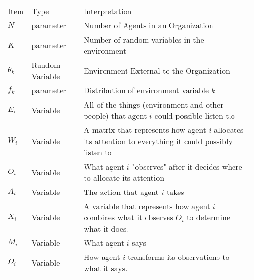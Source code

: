 \documentclass{article}
\begin{document}
\begin{table}[h!]
\centering
\begin{tabular}{|p{1in}|p{1.5in}|p{3in}|}
\hline
Item       & Type            & Interpretation                                                                                           \\
$N$          & parameter       & Number of Agents in an Organization                                                                      \\
$K$          & parameter       & Number of random variables in the environment                                                            \\
$\theta_k$ & Random Variable & Environment External to the Organization                                                                 \\
$f_k$      & parameter       & Distribution of environment variable $k$                                                                 \\
$E_i$      & Variable        & All of the things (environment and other people) that agent $i$ could possible listen t.o                \\
$W_i$      & Variable        & A matrix that represents how agent $i$ allocates its attention to everything it could possibly listen to \\
$O_i$      & Variable        & What agent $i$ "observes" after it decides where to allocate its attention                               \\
$A_i$      & Variable        & The action that agent $i$ takes                                                                          \\
$X_i$      & Variable        & A variable that represents how agent $i$ combines what it observes $O_i$ to determine what it does.      \\
$M_i$      & Variable        & What agent $i$ says                                                                                      \\
$\Omega_i$ & Variable        & How agent $i$ transforms its observations to
                               what it says.
  \\ \hline
\end{tabular}
\end{table}
\end{document}
